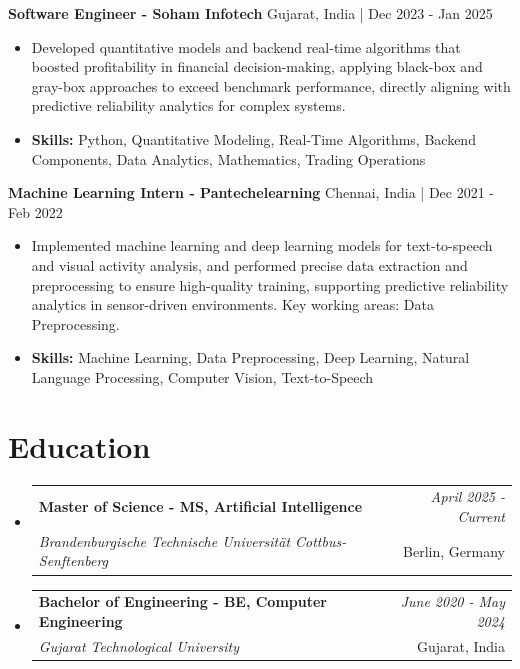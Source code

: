\documentclass[a4paper,11pt]{article}
\makeatletter
\newcommand{\resumeSubheading}[4]{
\vspace{0.5mm}\item
    \begin{tabular*}{\linewidth}[t]{l@{\extracolsep{\fill}}r}
        \textbf{#1} & \textit{\footnotesize{#4}} \\
        \textit{\footnotesize{#3}} &  \footnotesize{#2}\\
    \end{tabular*}
    \vspace{-2.4mm}
}
\makeatother
\begin{document}
\vspace{1mm}
  \textbf{Software Engineer - Soham Infotech} \hfill Gujarat, India | Dec 2023 - Jan 2025
\vspace{-1.5mm} %
\begin{itemize}
  \item Developed quantitative models and backend real-time algorithms that boosted profitability in financial decision-making, applying black-box and gray-box approaches to exceed benchmark performance, directly aligning with predictive reliability analytics for complex systems.

\vspace{-2mm}
  \item \textbf{Skills:} Python, Quantitative Modeling, Real-Time Algorithms, Backend Components, Data Analytics, Mathematics, Trading Operations
\end{itemize}

\vspace{1mm}
  \textbf{Machine Learning Intern - Pantechelearning} \hfill Chennai, India | Dec 2021 - Feb 2022
\vspace{-1.5mm} %
\begin{itemize}
  \item Implemented machine learning and deep learning models for text-to-speech and visual activity analysis, and performed precise data extraction and preprocessing to ensure high-quality training, supporting predictive reliability analytics in sensor-driven environments. Key working areas: Data Preprocessing.
\vspace{-2mm}
  \item \textbf{Skills:} Machine Learning, Data Preprocessing, Deep Learning, Natural Language Processing, Computer Vision, Text-to-Speech
\end{itemize}\section{\textbf{Education}}
\vspace{-0.4mm}

\begin{itemize}[leftmargin=0.15in, label={}]
\resumeSubheading
{Master of Science - MS, Artificial Intelligence }{Berlin, Germany}
{Brandenburgische Technische Universität Cottbus-Senftenberg  }{April 2025 - Current}

\vspace{1.0mm} %
\resumeSubheading
{Bachelor of Engineering - BE, Computer Engineering  }{Gujarat, India}
{Gujarat Technological University }{June 2020 - May 2024}

\end{itemize}
\end{document}
